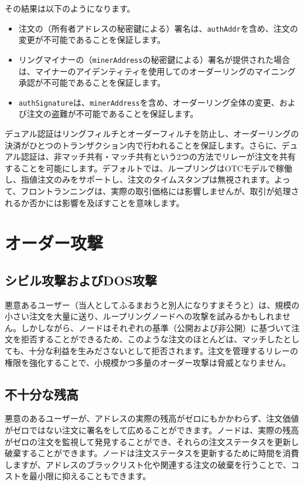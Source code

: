 \documentclass{article}
\begin{document}
\begin{multicols}{2}
\begin{enumerate}
\end{enumerate}

その結果は以下のようになります。

\begin{itemize}

	\item  注文の（所有者アドレスの秘密鍵による）署名は、\verb|authAddr|を含め、注文の変更が不可能であることを保証します。
	\item  リングマイナーの（\verb|minerAddress|の秘密鍵による）署名が提供された場合は、マイナーのアイデンティティを使用してのオーダーリングのマイニング承認が不可能であることを保証します。
	\item  \verb|authSignature|は、\verb|minerAddress|を含め、オーダーリング全体の変更、および注文の盗難が不可能であることを保証します。

\end{itemize}

デュアル認証はリングフィルチとオーダーフィルチを防止し、オーダーリングの決済がひとつのトランザクション内で行われることを保証します。さらに、デュアル認証は、非マッチ共有・マッチ共有という2つの方法でリレーが注文を共有することを可能にします。デフォルトでは、ループリングはOTCモデルで稼働し、指値注文のみをサポートし、注文のタイムスタンプは無視されます。よって、フロントランニングは、実際の取引価格には影響しませんが、取引が処理されるか否かには影響を及ぼすことを意味します。

\section{オーダー攻撃}

\subsection{シビル攻撃およびDOS攻撃}
悪意あるユーザー（当人としてふるまおうと別人になりすまそうと）は、規模の小さい注文を大量に送り、ループリングノードへの攻撃を試みるかもしれません。しかしながら、ノードはそれぞれの基準（公開および非公開）に基づいて注文を拒否することができるため、このような注文のほとんどは、マッチしたとしても、十分な利益を生みださないとして拒否されます。注文を管理するリレーの権限を強化することで、小規模かつ多量のオーダー攻撃は脅威となりません。

\subsection{不十分な残高}
悪意のあるユーザーが、アドレスの実際の残高がゼロにもかかわらず、注文価値がゼロではない注文に署名をして広めることができます。ノードは、実際の残高がゼロの注文を監視して発見することができ、それらの注文ステータスを更新し破棄することができます。ノードは注文ステータスを更新するために時間を消費しますが、アドレスのブラックリスト化や関連する注文の破棄を行うことで、コストを最小限に抑えることもできます。


\end{multicols}
\end{document}
